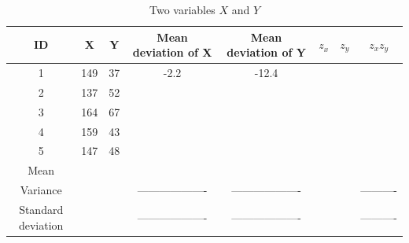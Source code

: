 \begin{table}[ht]
	\centering
	\caption{Two variables $X$ and $Y$}
	\begin{tabular}{cccccccc}
		\hline
		ID                 & X   & Y  & Mean deviation of X & Mean deviation of Y & $z_x$ & $z_y$ & $z_x z_y$  \\
		\hline
		1                  & 149 & 37 & -2.2                & -12.4               &       &       &            \\
		2                  & 137 & 52 &                     &                     &       &       &            \\
		3                  & 164 & 67 &                     &                     &       &       &            \\
		4                  & 159 & 43 &                     &                     &       &       &            \\
		5                  & 147 & 48 &                     &                     &       &       &            \\
		\hline
		Mean               &     &    &                     &                     &       &       &            \\
		Variance           &     &    & ------------------- & ------------------- &       &       & ---------- \\
		Standard deviation &     &    & ------------------- & ------------------- &       &       & ---------- \\\hline
	\end{tabular}
	\label{tbl::m04_05again}
\end{table}
